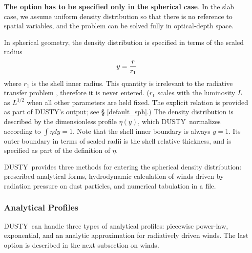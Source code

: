\documentclass[11pt]{article}
\def\D  {{\sf DUSTY}}
\begin{document}
{\bf The option has to be specified only in the spherical case}. In the slab case,
we assume uniform density distribution so that there is no reference to spatial
variables, and the problem can be solved fully in optical-depth space.

In spherical geometry, the density distribution  is specified in terms of the
scaled radius
\[
                        y = {r \over r_1}
\]
where $r_1$ is the shell inner radius.  This quantity is irrelevant to the
radiative transfer problem \cite{IE97}, therefore it is never entered. ($r_1$
scales with the luminosity $L$ as $L^{1/2}$ when all other parameters are held
fixed. The explicit relation is provided as part of \D's output; see \S
\ref{default_sph}.) The density distribution is described by the dimensionless
profile $\eta(y)$, which \D\ normalizes according to $\int\eta dy = 1$. Note
that the shell inner boundary is always $y = 1$.  Its outer boundary in terms
of scaled radii is the shell relative thickness, and is specified as part of
the definition of $\eta$.

\D\ provides three methods for entering the spherical density distribution:
prescribed analytical forms, hydrodynamic calculation of winds driven by
radiation pressure on dust particles, and numerical tabulation in a file.

\subsubsection{Analytical Profiles}

\D\ can handle three types of analytical profiles: piecewise power-law,
exponential, and an analytic approximation for radiatively driven winds.  The
last option is described in the next subsection on winds.
\end{document}
